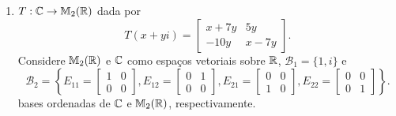 \documentclass[12pt]{exam}
\begin{document}
\begin{exercicio}
\begin{enumerate}[label={\alph*})]
        \item $T : \mathbb{C} \to \mathbb{M}_2(\mathbb{R})$ dada por
        \[
        T(x + yi) = \begin{bmatrix}
            x + 7y & 5y\\
            -10y & x - 7y
        \end{bmatrix}.
        \]
        Considere $\mathbb{M}_2(\mathbb{R})$ e $\mathbb{C}$ como espaços vetoriais sobre $\mathbb{R}$,  $\mathcal{B}_1 = \{1, i\}$ e
        \[
        \mathcal{B}_2 = \left\{E_{11} = \begin{bmatrix}
            1 & 0\\0 & 0
        \end{bmatrix}, E_{12} = \begin{bmatrix}
            0 & 1\\0 & 0
        \end{bmatrix}, E_{21} = \begin{bmatrix}
            0 & 0\\1 & 0
        \end{bmatrix}, E_{22} = \begin{bmatrix}
            0 & 0\\0 & 1
        \end{bmatrix}\right\}.
        \]
        bases ordenadas de $\mathbb{C}$ e $\mathbb{M}_2(\mathbb{R})$, respectivamente.


\end{enumerate}
\end{exercicio}
\end{document}
